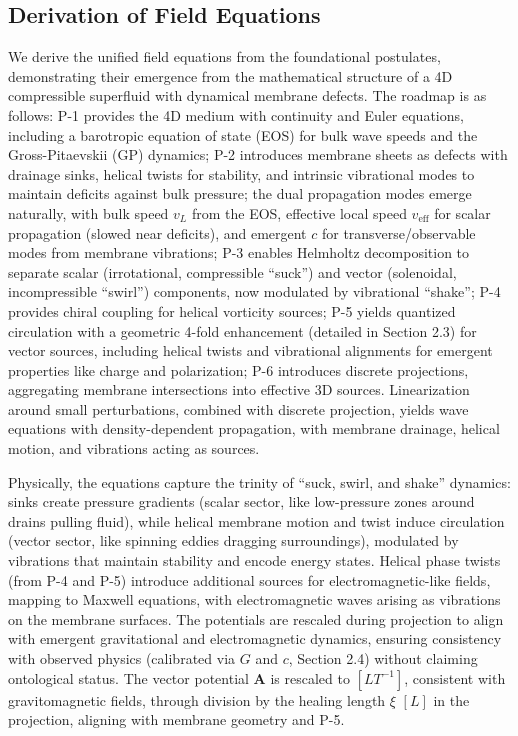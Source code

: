 \subsection{Derivation of Field Equations}

We derive the unified field equations from the foundational postulates, demonstrating their emergence from the mathematical structure of a 4D compressible superfluid with dynamical membrane defects. The roadmap is as follows: P-1 provides the 4D medium with continuity and Euler equations, including a barotropic equation of state (EOS) for bulk wave speeds and the Gross-Pitaevskii (GP) dynamics; P-2 introduces membrane sheets as defects with drainage sinks, helical twists for stability, and intrinsic vibrational modes to maintain deficits against bulk pressure; the dual propagation modes emerge naturally, with bulk speed $v_L$ from the EOS, effective local speed $v_{\text{eff}}$ for scalar propagation (slowed near deficits), and emergent $c$ for transverse/observable modes from membrane vibrations; P-3 enables Helmholtz decomposition to separate scalar (irrotational, compressible ``suck'') and vector (solenoidal, incompressible ``swirl'') components, now modulated by vibrational ``shake''; P-4 provides chiral coupling for helical vorticity sources; P-5 yields quantized circulation with a geometric 4-fold enhancement (detailed in Section 2.3) for vector sources, including helical twists and vibrational alignments for emergent properties like charge and polarization; P-6 introduces discrete projections, aggregating membrane intersections into effective 3D sources. Linearization around small perturbations, combined with discrete projection, yields wave equations with density-dependent propagation, with membrane drainage, helical motion, and vibrations acting as sources.

Physically, the equations capture the trinity of ``suck, swirl, and shake'' dynamics: sinks create pressure gradients (scalar sector, like low-pressure zones around drains pulling fluid), while helical membrane motion and twist induce circulation (vector sector, like spinning eddies dragging surroundings), modulated by vibrations that maintain stability and encode energy states. Helical phase twists (from P-4 and P-5) introduce additional sources for electromagnetic-like fields, mapping to Maxwell equations, with electromagnetic waves arising as vibrations on the membrane surfaces. The potentials are rescaled during projection to align with emergent gravitational and electromagnetic dynamics, ensuring consistency with observed physics (calibrated via $G$ and $c$, Section 2.4) without claiming ontological status. The vector potential $\mathbf{A}$ is rescaled to $[L T^{-1}]$, consistent with gravitomagnetic fields, through division by the healing length $\xi$ $[L]$ in the projection, aligning with membrane geometry and P-5.

